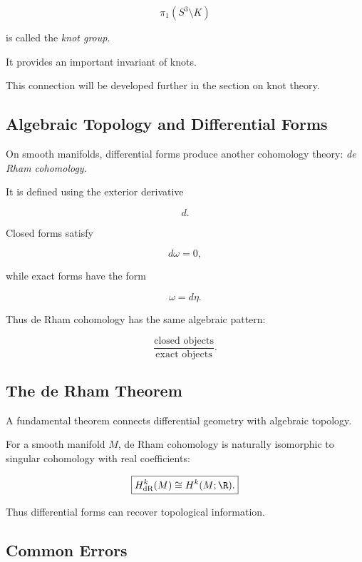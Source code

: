 \[
\boxed{
\pi_1(S^3\setminus K)
}
\]

is called the \emph{knot group}.

It provides an important invariant of knots.

This connection will be developed further in the section on knot theory.

\subsection{Algebraic Topology and Differential Forms}
\label{subsec:algebraic-topology-differential-forms}

On smooth manifolds, differential forms produce another cohomology theory:
\emph{de Rham cohomology}.

It is defined using the exterior derivative

\[
d.
\]

Closed forms satisfy

\[
d\omega=0,
\]

while exact forms have the form

\[
\omega=d\eta.
\]

Thus de Rham cohomology has the same algebraic pattern:

\[
\boxed{
\frac{\text{closed objects}}{\text{exact objects}}.
}
\]

\subsection{The de Rham Theorem}
\label{subsec:de-rham-theorem-preview}

A fundamental theorem connects differential geometry with algebraic
topology.

\begin{theorem}
For a smooth manifold \(M\), de Rham cohomology is naturally isomorphic to
singular cohomology with real coefficients:

\[
\boxed{
H_{\mathrm{dR}}^k(M)
\cong
H^k(M;\R).
}
\]
\end{theorem}

Thus differential forms can recover topological information.

\subsection{Common Errors}
\label{subsec:algebraic-topology-common-errors}

